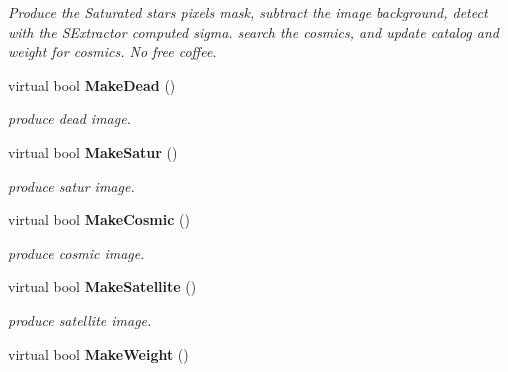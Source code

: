 \begin{CompactItemize}
\begin{CompactList}\small\item\em Produce the Saturated stars pixels mask, subtract the image background, detect with the SExtractor computed sigma. search the cosmics, and update catalog and weight for cosmics. No free coffee.\item\end{CompactList}\item 
{}
virtual bool {\bf Make\-Dead} ()\label{class_transformedimage_a11}

\begin{CompactList}\small\item\em produce dead image.\item\end{CompactList}\item 
{}
virtual bool {\bf Make\-Satur} ()\label{class_transformedimage_a12}

\begin{CompactList}\small\item\em produce satur image.\item\end{CompactList}\item 
{}
virtual bool {\bf Make\-Cosmic} ()\label{class_transformedimage_a13}

\begin{CompactList}\small\item\em produce cosmic image.\item\end{CompactList}\item 
{}
virtual bool {\bf Make\-Satellite} ()\label{class_transformedimage_a14}

\begin{CompactList}\small\item\em produce satellite image.\item\end{CompactList}\item 
{}
virtual bool {\bf Make\-Weight} ()\label{class_transformedimage_a15}


\end{CompactItemize}
